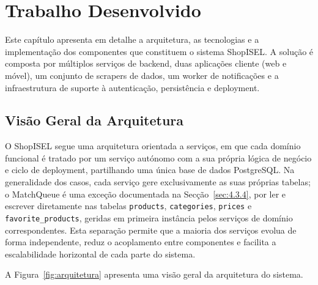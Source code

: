 
\chapter{Trabalho Desenvolvido}
\label{chap:4}

Este capítulo apresenta em detalhe a arquitetura, as tecnologias e a implementação dos componentes que constituem o sistema ShopISEL. A solução é composta por múltiplos serviços de backend, duas aplicações cliente (web e móvel), um conjunto de scrapers de dados, um worker de notificações e a infraestrutura de suporte à autenticação, persistência e deployment.

\section{Visão Geral da Arquitetura}
\label{sec:4.1}

O ShopISEL segue uma arquitetura orientada a serviços, em que cada domínio funcional é tratado por um serviço autónomo com a sua própria lógica de negócio e ciclo de deployment, partilhando uma única base de dados PostgreSQL. Na generalidade dos casos, cada serviço gere exclusivamente as suas próprias tabelas; o MatchQueue é uma exceção documentada na Secção~\ref{sec:4.3.4}, por ler e escrever diretamente nas tabelas \texttt{products}, \texttt{categories}, \texttt{prices} e \texttt{favorite\_products}, geridas em primeira instância pelos serviços de domínio correspondentes. Esta separação permite que a maioria dos serviços evolua de forma independente, reduz o acoplamento entre componentes e facilita a escalabilidade horizontal de cada parte do sistema.

A Figura~\ref{fig:arquitetura} apresenta uma visão geral da arquitetura do sistema.

